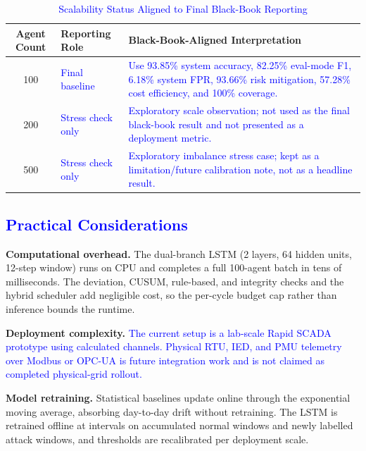\documentclass[conference,a4paper]{IEEEtran}
\begin{document}
\begin{table}[htbp]
\caption{\textcolor{blue}{Scalability Status Aligned to Final Black-Book Reporting}}
\begin{center}
\begin{tabular}{|c|p{2.7cm}|p{4.4cm}|}
\hline
\textbf{Agent Count} & \textbf{Reporting Role} & \textbf{Black-Book-Aligned Interpretation} \\
\hline
100 & \textcolor{blue}{Final baseline} & \textcolor{blue}{Use 93.85\% system accuracy, 82.25\% eval-mode F1, 6.18\% system FPR, 93.66\% risk mitigation, 57.28\% cost efficiency, and 100\% coverage.} \\
\hline
200 & \textcolor{blue}{Stress check only} & \textcolor{blue}{Exploratory scale observation; not used as the final black-book result and not presented as a deployment metric.} \\
\hline
500 & \textcolor{blue}{Stress check only} & \textcolor{blue}{Exploratory imbalance stress case; kept as a limitation/future calibration note, not as a headline result.} \\
\hline
\end{tabular}
\label{tab:scale}
\end{center}
\end{table}

\subsection{\textcolor{blue}{Practical Considerations}}

\textbf{Computational overhead.} The dual-branch LSTM (2 layers, 64 hidden units, 12-step window) runs on CPU and completes a full 100-agent batch in tens of milliseconds. The deviation, CUSUM, rule-based, and integrity checks and the hybrid scheduler add negligible cost, so the per-cycle budget cap rather than inference bounds the runtime.

\textbf{Deployment complexity.} \textcolor{blue}{The current setup is a lab-scale Rapid SCADA prototype using calculated channels. Physical RTU, IED, and PMU telemetry over Modbus or OPC-UA is future integration work and is not claimed as completed physical-grid rollout.}

\textbf{Model retraining.} Statistical baselines update online through the exponential moving average, absorbing day-to-day drift without retraining. The LSTM is retrained offline at intervals on accumulated normal windows and newly labelled attack windows, and thresholds are recalibrated per deployment scale.
\end{document}
